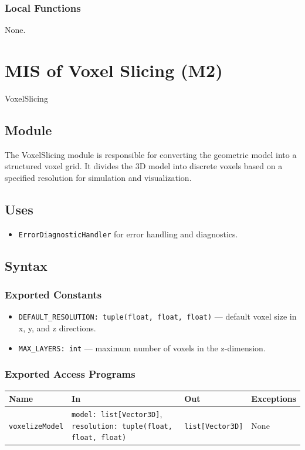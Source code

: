 \documentclass[12pt, titlepage]{article}
\begin{document}
\subsubsection{Local Functions}
None.

\section{MIS of Voxel Slicing (M2)}\label{Module2}

VoxelSlicing

\subsection{Module}
The VoxelSlicing module is responsible for converting the geometric model into a structured voxel grid. It divides the 3D model into discrete voxels based on a specified resolution for simulation and visualization.

\subsection{Uses}
\begin{itemize}
  \item \texttt{ErrorDiagnosticHandler} for error handling and diagnostics.
\end{itemize}

\subsection{Syntax}

\subsubsection{Exported Constants}
\begin{itemize}
  \item \texttt{DEFAULT\_RESOLUTION: tuple(float, float, float)} — default voxel size in x, y, and z directions.
  \item \texttt{MAX\_LAYERS: int} — maximum number of voxels in the z-dimension.
\end{itemize}

\subsubsection{Exported Access Programs}
\begin{center}
\renewcommand{\arraystretch}{1.3}
\begin{tabular}{p{3.5cm} p{4.5cm} p{3.5cm} p{3.5cm}}
\toprule
\textbf{Name} & \textbf{In} & \textbf{Out} & \textbf{Exceptions} \\
\midrule
\texttt{voxelizeModel} & \texttt{model: list[Vector3D]}, \texttt{resolution: tuple(float, float, float)} & \texttt{list[Vector3D]} & None \\
\bottomrule
\end{tabular}
\end{center}
\end{document}

